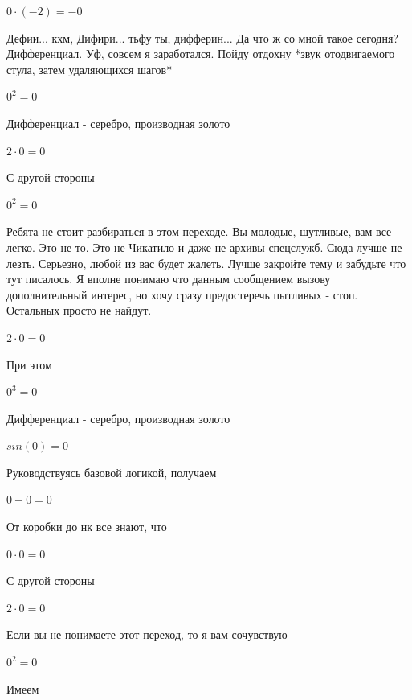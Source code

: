 \documentclass[12pt,a4paper,fleqn]{article}
\begin{document}
\begin{center}$0 \cdot (-2) = -0$\end{center}
Дефии... кхм, Дифири... тьфу ты, дифферин... Да что ж со мной такое сегодня? Дифференциал. Уф, совсем я заработался. Пойду отдохну *звук отодвигаемого стула, затем удаляющихся шагов*

\begin{center}$0^{2} = 0$\end{center}
Дифференциал - серебро, производная золото\cite{link2}

\begin{center}$2 \cdot 0 = 0$\end{center}
С другой стороны

\begin{center}$0^{2} = 0$\end{center}
Ребята не стоит разбираться в этом переходе. Вы молодые, шутливые, вам все легко. Это не то. Это не Чикатило и даже не архивы спецслужб. Сюда лучше не лезть. Серьезно, любой из вас будет жалеть. Лучше закройте тему и забудьте что тут писалось. Я вполне понимаю что данным сообщением вызову дополнительный интерес, но хочу сразу предостеречь пытливых - стоп. Остальных просто не найдут.

\begin{center}$2 \cdot 0 = 0$\end{center}
При этом

\begin{center}$0^{3} = 0$\end{center}
Дифференциал - серебро, производная золото\cite{link2}

\begin{center}$sin(0) = 0$\end{center}
Руководствуясь базовой логикой, получаем

\begin{center}$0-0 = 0$\end{center}
От коробки до нк все знают, что

\begin{center}$0 \cdot 0 = 0$\end{center}
С другой стороны

\begin{center}$2 \cdot 0 = 0$\end{center}
Если вы не понимаете этот переход, то я вам сочувствую

\begin{center}$0^{2} = 0$\end{center}
Имеем
\end{document}
